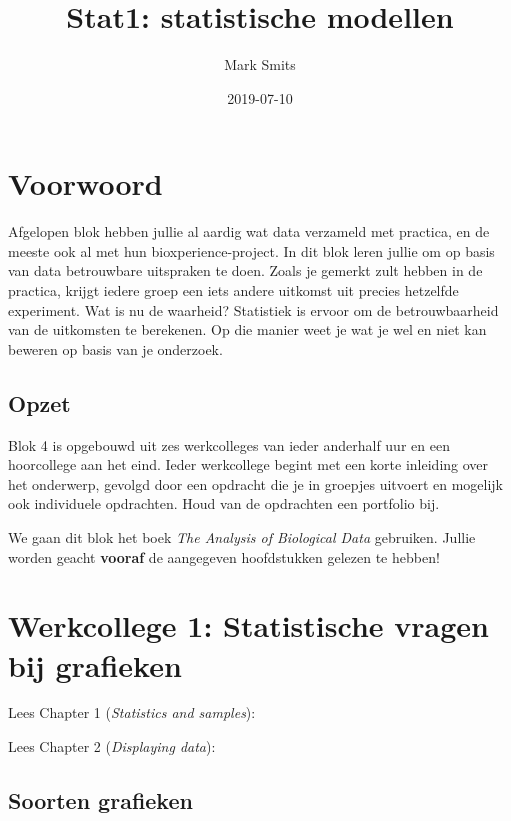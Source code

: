 \documentclass[]{book}
\title{Stat1: statistische modellen}
\author{Mark Smits}
\date{2019-07-10}
\theoremstyle{definition}
\theoremstyle{definition}
\theoremstyle{definition}
\theoremstyle{remark}
\let\BeginKnitrBlock\begin \let\EndKnitrBlock\end
\begin{document}
\maketitle

{
\setcounter{tocdepth}{1}
\tableofcontents
}
\chapter*{Voorwoord}\label{voorwoord}

Afgelopen blok hebben jullie al aardig wat data verzameld met practica,
en de meeste ook al met hun bioxperience-project. In dit blok leren
jullie om op basis van data betrouwbare uitspraken te doen. Zoals je
gemerkt zult hebben in de practica, krijgt iedere groep een iets andere
uitkomst uit precies hetzelfde experiment. Wat is nu de waarheid?
Statistiek is ervoor om de betrouwbaarheid van de uitkomsten te
berekenen. Op die manier weet je wat je wel en niet kan beweren op basis
van je onderzoek.

\section*{Opzet}\label{opzet}

Blok 4 is opgebouwd uit zes werkcolleges van ieder anderhalf uur en een
hoorcollege aan het eind. Ieder werkcollege begint met een korte
inleiding over het onderwerp, gevolgd door een opdracht die je in
groepjes uitvoert en mogelijk ook individuele opdrachten. Houd van de
opdrachten een portfolio bij.

We gaan dit blok het boek \emph{The Analysis of Biological Data}
gebruiken. Jullie worden geacht \textbf{vooraf} de aangegeven
hoofdstukken gelezen te hebben!

\chapter{Werkcollege 1: Statistische vragen bij
grafieken}\label{werkcollege-1-statistische-vragen-bij-grafieken}

\BeginKnitrBlock{ABD}
Lees Chapter 1 (\emph{Statistics and samples}):

Lees Chapter 2 (\emph{Displaying data}):
\EndKnitrBlock{ABD}

\section{Soorten grafieken}\label{soorten-grafieken}
\end{document}
